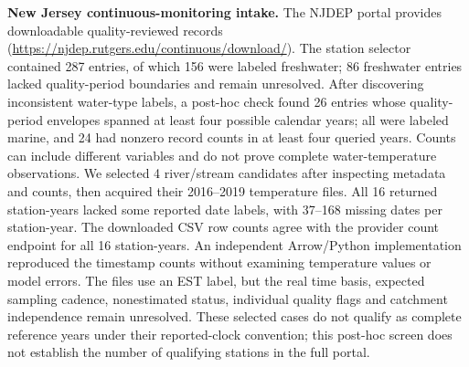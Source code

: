 \par\medskip\noindent\textbf{New Jersey continuous-monitoring intake.} The NJDEP portal provides downloadable quality-reviewed records (\url{https://njdep.rutgers.edu/continuous/download/}). The station selector contained 287 entries, of which 156 were labeled freshwater; 86 freshwater entries lacked quality-period boundaries and remain unresolved. After discovering inconsistent water-type labels, a post-hoc check found 26 entries whose quality-period envelopes spanned at least four possible calendar years; all were labeled marine, and 24 had nonzero record counts in at least four queried years. Counts can include different variables and do not prove complete water-temperature observations. We selected 4 river/stream candidates after inspecting metadata and counts, then acquired their 2016--2019 temperature files. All 16 returned station-years lacked some reported date labels, with 37--168 missing dates per station-year. The downloaded CSV row counts agree with the provider count endpoint for all 16 station-years. An independent Arrow/Python implementation reproduced the timestamp counts without examining temperature values or model errors. The files use an EST label, but the real time basis, expected sampling cadence, nonestimated status, individual quality flags and catchment independence remain unresolved. These selected cases do not qualify as complete reference years under their reported-clock convention; this post-hoc screen does not establish the number of qualifying stations in the full portal.
